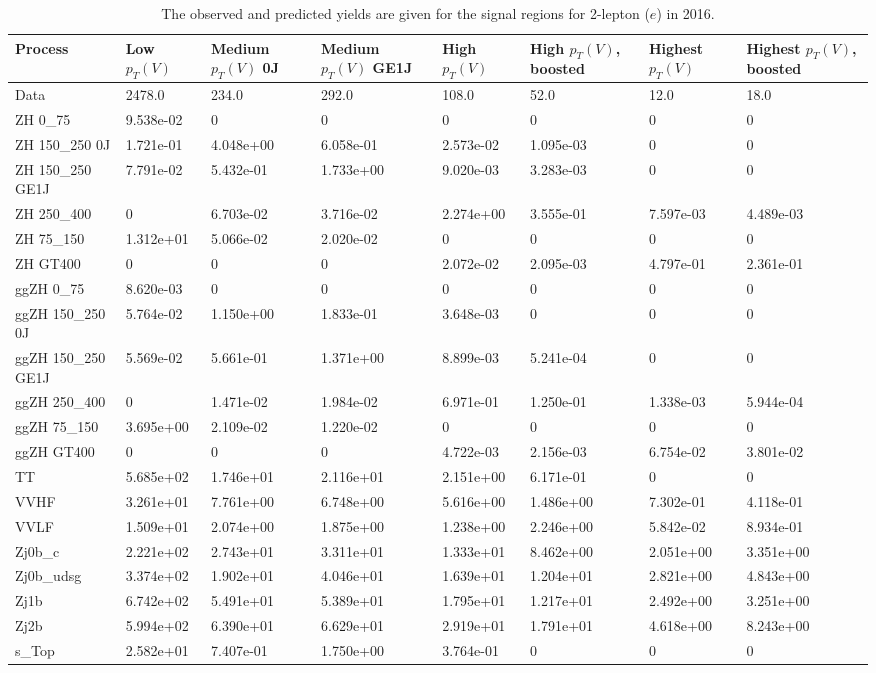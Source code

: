 \begin{table}
\centering
\caption[2016 2-lepton ($e$) signal selection yields]{
                  The observed and predicted yields are given for the
                  signal regions for 2-lepton ($e$) in 2016.
                  }
{\footnotesize
\begin{tabularx}{\textwidth}{|X|X|X|X|X|X|X|X|}
\hline
Process & Low $p_{T}(V)$ & Medium $p_{T}(V)$ 0J & Medium $p_{T}(V)$ GE1J & High $p_{T}(V)$ & High $p_{T}(V)$, boosted & Highest $p_{T}(V)$ & Highest $p_{T}(V)$, boosted \\
\hline
Data & 2478.0 & 234.0 & 292.0 & 108.0 & 52.0 & 12.0 & 18.0 \\
\hline
ZH 0\_75 & 9.538e-02 & 0 & 0 & 0 & 0 & 0 & 0 \\
ZH 150\_250 0J & 1.721e-01 & 4.048e+00 & 6.058e-01 & 2.573e-02 & 1.095e-03 & 0 & 0 \\
ZH 150\_250 GE1J & 7.791e-02 & 5.432e-01 & 1.733e+00 & 9.020e-03 & 3.283e-03 & 0 & 0 \\
ZH 250\_400 & 0 & 6.703e-02 & 3.716e-02 & 2.274e+00 & 3.555e-01 & 7.597e-03 & 4.489e-03 \\
ZH 75\_150 & 1.312e+01 & 5.066e-02 & 2.020e-02 & 0 & 0 & 0 & 0 \\
ZH GT400 & 0 & 0 & 0 & 2.072e-02 & 2.095e-03 & 4.797e-01 & 2.361e-01 \\
ggZH 0\_75 & 8.620e-03 & 0 & 0 & 0 & 0 & 0 & 0 \\
ggZH 150\_250 0J & 5.764e-02 & 1.150e+00 & 1.833e-01 & 3.648e-03 & 0 & 0 & 0 \\
ggZH 150\_250 GE1J & 5.569e-02 & 5.661e-01 & 1.371e+00 & 8.899e-03 & 5.241e-04 & 0 & 0 \\
ggZH 250\_400 & 0 & 1.471e-02 & 1.984e-02 & 6.971e-01 & 1.250e-01 & 1.338e-03 & 5.944e-04 \\
ggZH 75\_150 & 3.695e+00 & 2.109e-02 & 1.220e-02 & 0 & 0 & 0 & 0 \\
ggZH GT400 & 0 & 0 & 0 & 4.722e-03 & 2.156e-03 & 6.754e-02 & 3.801e-02 \\
\hline
TT & 5.685e+02 & 1.746e+01 & 2.116e+01 & 2.151e+00 & 6.171e-01 & 0 & 0 \\
VVHF & 3.261e+01 & 7.761e+00 & 6.748e+00 & 5.616e+00 & 1.486e+00 & 7.302e-01 & 4.118e-01 \\
VVLF & 1.509e+01 & 2.074e+00 & 1.875e+00 & 1.238e+00 & 2.246e+00 & 5.842e-02 & 8.934e-01 \\
Zj0b\_c & 2.221e+02 & 2.743e+01 & 3.311e+01 & 1.333e+01 & 8.462e+00 & 2.051e+00 & 3.351e+00 \\
Zj0b\_udsg & 3.374e+02 & 1.902e+01 & 4.046e+01 & 1.639e+01 & 1.204e+01 & 2.821e+00 & 4.843e+00 \\
Zj1b & 6.742e+02 & 5.491e+01 & 5.389e+01 & 1.795e+01 & 1.217e+01 & 2.492e+00 & 3.251e+00 \\
Zj2b & 5.994e+02 & 6.390e+01 & 6.629e+01 & 2.919e+01 & 1.791e+01 & 4.618e+00 & 8.243e+00 \\
s\_Top & 2.582e+01 & 7.407e-01 & 1.750e+00 & 3.764e-01 & 0 & 0 & 0 \\
\hline
\end{tabularx}
}
\label{tab:sr-Zee-2016}
\end{table}

